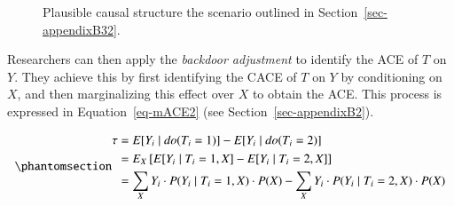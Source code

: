 \documentclass[
  authoryear,
  review,
  1p]{elsarticle}
\begin{document}
\begin{figure}

\begin{minipage}{0.50\linewidth}

\centering{

\[
\begin{aligned}
  X & := f_{X}(e_{X}) \\
  T & := t \\
  Y & := f_{Y}(t,X,e_{Y}) \\
  e_{T} & \:\bot\:e_{X} \\
  e_{T} & \:\bot\:e_{Y} \\
  e_{X} & \:\bot\:e_{Y}
\end{aligned}
\]

}


\end{minipage}%
%
\begin{minipage}{0.50\linewidth}



\end{minipage}%

\caption{\label{fig-example3}Plausible causal structure the scenario
outlined in Section~\ref{sec-appendixB32}.}

\end{figure}%

Researchers can then apply the \emph{backdoor adjustment} to identify
the ACE of \(T\) on \(Y\). They achieve this by first identifying the
CACE of \(T\) on \(Y\) by conditioning on \(X\), and then marginalizing
this effect over \(X\) to obtain the ACE. This process is expressed in
Equation~\ref{eq-mACE2} (see Section~\ref{sec-appendixB2}).

\begin{equation}\phantomsection\label{eq-mACE2}{
\begin{aligned}
  \tau & = E[Y_{i} \mid do(T_{i}=1)]- E[Y_{i} \mid do(T_{i}=2)] \\
  & = E_{X}\left[ E[Y_{i} \mid T_{i}=1, X] - E[Y_{i} \mid T_{i}=2, X] \right] \\
  & = \sum_{X} Y_{i} \cdot P( Y_{i} \mid T_{i}=1, X) \cdot P(X) - \sum_{X} Y_{i} \cdot P( Y_{i} \mid T_{i}=2, X) \cdot P(X)
\end{aligned}
}\end{equation}
\end{document}
